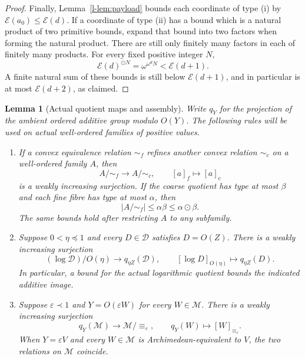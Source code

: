 \documentclass[11pt]{article}
\newtheorem{lemma}[theorem]{Lemma}
\theoremstyle{definition}
\theoremstyle{remark}
\newcommand{\od}{\mathbin{\odot}}
\newcommand{\EE}{\mathcal E}
\numberwithin{equation}{section}
\begin{document}
\begin{proof}
Finally, Lemma~\ref{l-lem:payload} bounds each coordinate of
type \textup{(i)} by $\EE(a_0)\le\EE(d)$.  If a coordinate
of type \textup{(ii)} has a bound which is a natural product of
two primitive bounds, expand that bound into two factors when
forming the natural product.  There are still only finitely many
factors in each of finitely many products.  For every fixed
positive integer $N$,
\[
 \EE(d)^{\od N}=\omega^{\omega^d N}<\EE(d+1).
\]
A finite natural sum of these bounds is still below
$\EE(d+1)$, and in particular is at most $\EE(d+2)$, as claimed.
\end{proof}



\begin{lemma}[Actual quotient maps and assembly]\label{l-lem:quotient-maps}
Write $q_Y$ for the projection of the ambient ordered additive
group modulo $O(Y)$.  The following rules will be used on actual
well-ordered families of positive values.
\begin{enumerate}[label=\textup{(\roman*)},leftmargin=3em]
\item If a convex equivalence relation $\sim_f$ refines another
convex relation $\sim_c$ on a well-ordered family $A$, then
\[
 A/{\sim_f}\longrightarrow A/{\sim_c},\qquad
 [a]_f\longmapsto[a]_c
\]
is a weakly increasing surjection.  If the coarse quotient has
type at most $\beta$ and each fine fibre has type at most $\alpha$,
then
\[
 |A/{\sim_f}|\le\alpha\beta\le\alpha\od\beta.
\]
The same bounds hold after restricting $A$ to any subfamily.

\item Suppose $0<\eta\preceq1$ and every $D\in\mathcal D$
satisfies $D=O(Z)$.  There is a weakly increasing surjection
\begin{equation}
 (\log\mathcal D)/O(\eta)\longrightarrow q_{\eta Z}(\mathcal D),
 \qquad [\log D]_{O(\eta)}\longmapsto q_{\eta Z}(D).
 \label{l-eq:log-to-additive}
\end{equation}
In particular, a bound for the actual logarithmic quotient
bounds the indicated additive image.

\item Suppose $\varepsilon\prec1$ and
$Y=O(\varepsilon W)$ for every $W\in\mathcal M$.  There is a
weakly increasing surjection
\begin{equation}
 q_Y(\mathcal M)\longrightarrow\mathcal M/{\equiv_\varepsilon},
 \qquad q_Y(W)\longmapsto[W]_{\equiv_\varepsilon}.
 \label{l-eq:additive-to-log}
\end{equation}
When $Y=\varepsilon V$ and every $W\in\mathcal M$ is
Archimedean-equivalent to $V$, the two relations on $\mathcal M$
coincide.


\end{enumerate}
\end{lemma}
\end{document}
